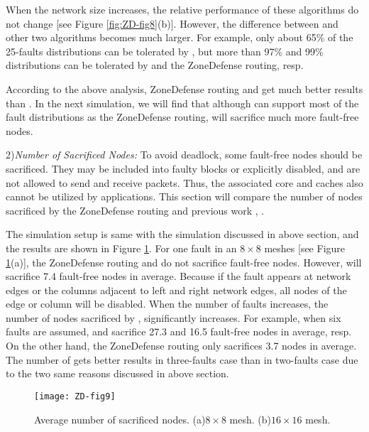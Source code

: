 When the network size increases, the relative performance of these algorithms do not change [see Figure \ref{fig:ZD-fig8}(b)]. However, the difference between \cite{zhang2008reconfigurable} and other two algorithms becomes much larger. For example, only about 65\% of the 25-faults distributions can be tolerated by \cite{zhang2008reconfigurable}, but more than 97\% and 99\% distributions can be tolerated by \cite{wu2003fault} and the ZoneDefense routing, resp.

According to the above analysis, ZoneDefense routing and \cite{wu2003fault} get much better results than \cite{zhang2008reconfigurable}. In the next simulation, we will find that although \cite{wu2003fault} can support most of the fault distributions as the ZoneDefense routing, \cite{wu2003fault} will sacrifice much more fault-free nodes.

2)\textit{Number of Sacrificed Nodes:} To avoid deadlock, some fault-free nodes should be sacrificed. They may be included into faulty blocks or explicitly disabled, and are not allowed to send and receive packets. Thus, the associated core and caches also cannot be utilized by applications. This section will compare the number of nodes sacrificed by the ZoneDefense routing and previous work \cite{wu2003fault}, \cite{zhang2008reconfigurable}.

The simulation setup is same with the simulation discussed in above section, and the results are shown in Figure \ref{fig:ZD-fig9}. For one fault in an $8 \times 8$ meshes [see Figure \ref{fig:ZD-fig9}(a)], the ZoneDefense routing and \cite{zhang2008reconfigurable} do not sacrifice fault-free nodes. However, \cite{wu2003fault} will sacrifice 7.4 fault-free nodes in average. Because if the fault appears at network edges or the columns adjacent to left and right network edges, all nodes of the edge or column will be disabled. When the number of faults increases, the number of nodes sacrificed by \cite{wu2003fault}, \cite{zhang2008reconfigurable} significantly increases. For example, when six faults are assumed, \cite{wu2003fault} and \cite{zhang2008reconfigurable} sacrifice 27.3 and 16.5 fault-free nodes in average, resp. On the other hand, the ZoneDefense routing only sacrifices 3.7 nodes in average. The number of \cite{zhang2008reconfigurable} gets better results in three-faults case than in two-faults case due to the two same reasons discussed in above section.

\begin{figure}[h]
    \centering
        \texttt{[image: ZD-fig9]}
          \caption{Average number of sacrificed nodes. (a)$8 \times 8$ mesh. (b)$16 \times 16$ mesh.}
        \label{fig:ZD-fig9}
\end{figure}

